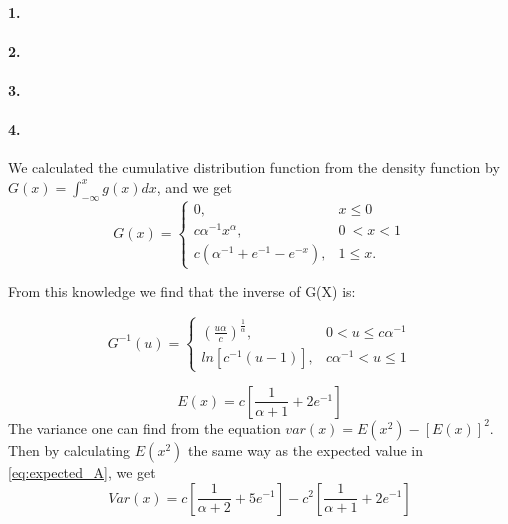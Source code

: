 \paragraph{1.}

\paragraph{2.}

\paragraph{3.}

\paragraph{4.}
We calculated the cumulative distribution function from the density function by 
$G(x) = \int_{-\infty}^{x} g(x) dx$, and we get
\begin{equation}
G(x) =
\begin{cases}
0, & x \leq 0 \\
c\alpha^{-1}x^\alpha, & 0\ < x < 1 \\
c(\alpha^{-1} + e^{-1}-e^{-x}), & 1\leq x .
\end{cases}
\end{equation}

From this knowledge we find that the inverse of G(X) is:

\begin{equation}
G^{-1}(u) = 
\begin{cases}
\left(\frac{u\alpha}{c}\right)^{\frac{1}{\alpha}}, & 0 < u \leq c\alpha^{-1} \\
ln\left[c^{-1}(u-1)\right], & c\alpha^{-1} < u \leq 1
\end{cases}
\end{equation}

\begin{equation}
    E(x) = c\left[\frac{1}{\alpha+1}+2e^{-1}\right]
\label{eq:expected_A}
\end{equation}
The variance one can find from the equation $var(x) = E(x^2)-\left[E(x)\right]^2$. Then by calculating $E(x^2)$ the same way as the expected value in \eqref{eq:expected_A}, we get
\begin{equation}
    Var(x) = c\left[\frac{1}{\alpha+2}+5e^{-1}\right] -c^2\left[ \frac{1}{\alpha+1}+ 2e^{-1}\right]
\end{equation}
